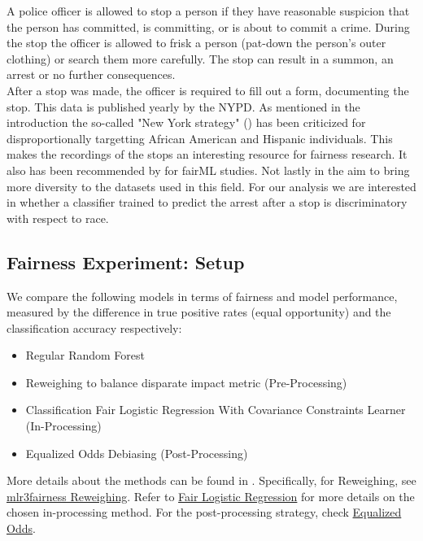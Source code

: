 A police officer is allowed to stop a person if they have reasonable suspicion that the person has committed, is committing, or is about to commit a crime.
During the stop the officer is allowed to frisk a person (pat-down the person's outer clothing) or search them more carefully.
The stop can result in a summon, an arrest or no further consequences.\\
After a stop was made, the officer is required to fill out a form, documenting the stop. This data is published yearly by the NYPD.
As mentioned in the introduction the so-called "New York strategy" (\cite{gelman2007}) has been criticized for disproportionally targetting African American and Hispanic individuals. This makes the recordings of the stops an interesting resource for fairness research.
It also has been recommended by \cite{Fabris_2022} for fairML studies. Not lastly in the aim to bring more diversity to the datasets used in this field.
For our analysis we are interested in whether a classifier trained to predict the arrest after a stop is discriminatory with respect to race.


\subsection{Fairness Experiment: Setup}
We compare the following models in terms of fairness and model performance, measured by the difference in true positive rates (equal opportunity)  and the classification accuracy respectively:
\begin{itemize}
    \item Regular Random Forest
    \item Reweighing to balance disparate impact metric (Pre-Processing)
    \item Classification Fair Logistic Regression With Covariance Constraints Learner (In-Processing)
    \item Equalized Odds Debiasing (Post-Processing)
\end{itemize}
More details about the methods can be found in \cite{mlr3_book}.  
Specifically, for Reweighing, see \href{https://mlr3fairness.mlr-org.com/reference/mlr_pipeops_reweighing.html}{mlr3fairness Reweighing}.  
Refer to \href{https://rdrr.io/cran/mlr3fairness/man/mlr_learners_classif.fairzlrm.html}{Fair Logistic Regression} for more details on the chosen in-processing method.  
For the post-processing strategy, check \href{https://mlr3fairness.mlr-org.com/reference/mlr_pipeops_equalized_odds.html}{Equalized Odds}.  

